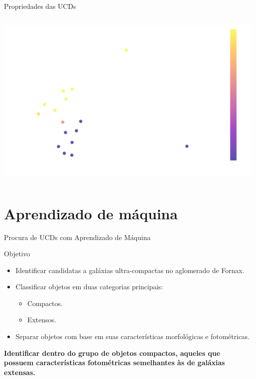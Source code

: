\begin{frame}[c]{Propriedades das UCDs}
\begin{columns}[c]
\begin{column}{0.48\textwidth}
            \vspace{0.5cm}
            \includegraphics[width=\textwidth, height=0.48\textheight]{images/distribuicao_fwhm_image_r_r_aper6_ucds_fornax.png}
        \end{column}
    \end{columns}
\end{frame}

\section{Aprendizado de máquina}
\begin{frame}[c]{Procura de UCDs com Aprendizado de Máquina}
    \begin{splusbox}{Objetivo}
        \begin{itemize}
            \item Identificar candidatas a galáxias ultra-compactas no aglomerado de Fornax.
            \item Classificar objetos em duas categorias principais:
            \begin{itemize}
                \item Compactos.
                \item Extensos.
            \end{itemize}
            \item Separar objetos com base em suas características morfológicas e fotométricas.
        \end{itemize}
    \end{splusbox}
    \textbf{Identificar dentro do grupo de objetos compactos, aqueles que possuem características fotométricas semelhantes às de galáxias extensas.}
\end{frame}

